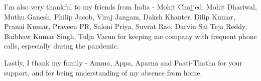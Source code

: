 \par
I'm also very thankful to my friends from India - Mohit Chajjed, Mohit Dhariwal, Muthu Ganesh, Philip Jacob, Viraj Jangam, Daksh Khanter, Dilip Kumar, Pranai Kumar, Praveen PR, Saloni Priya, Suvrat Rao, Darvin Sai Teja Reddy, Baibhaw Kumar Singh, Tulja Varun for keeping me company with frequent phone calls, especially during the pandemic. 
\par
Lastly, I thank my family - Amma, Appa, Aparna and Paati-Thatha for your support, and for being understanding of my absence from home. 
\newpage
\thispagestyle{empty}